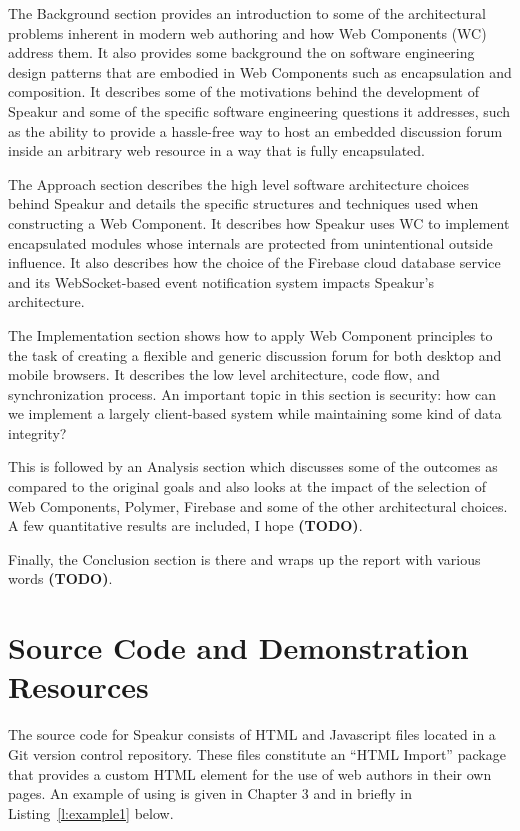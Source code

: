 The Background section provides an introduction to some of the architectural problems inherent in modern web authoring and how Web Components (WC) address them. 
It also provides some background the on software engineering design patterns that are embodied in Web Components such as encapsulation and composition.
It describes some of the motivations behind the development of Speakur and some of the specific software engineering questions it addresses, such as the ability to provide a hassle-free way to host an embedded discussion forum inside an arbitrary web resource in a way that is fully encapsulated.

The Approach section describes the high level software architecture choices behind Speakur and details the specific structures and techniques used when constructing a Web Component.
It describes how Speakur uses WC to implement encapsulated modules whose internals are protected from unintentional outside influence. 
It also describes how the choice of the Firebase cloud database service and its WebSocket-based event notification system impacts Speakur's architecture.

The Implementation section shows how to apply Web Component principles to the task of creating a flexible and generic discussion forum for both desktop and mobile browsers. 
It describes the low level architecture, code flow, and synchronization process.
An important topic in this section is security: how can we implement a largely client-based system while maintaining some kind of data integrity?

This is followed by an Analysis section which discusses some of the outcomes as compared to the original goals and also looks at the impact of the selection of Web Components, Polymer, Firebase and some of the other architectural choices. 
A few quantitative results are included, I hope \textbf{(TODO)}.

Finally, the Conclusion section is there and wraps up the report with various words \textbf{(TODO)}. 

\section{Source Code and Demonstration Resources}
%

The source code for Speakur consists of HTML and Javascript files located in a Git version control repository. 
These files constitute an ``HTML Import'' package that provides a
\textbf{}
custom HTML element for the use of web authors in their own pages.
An example of using  is given in Chapter 3 and in briefly in Listing~\ref{l:example1} below.

